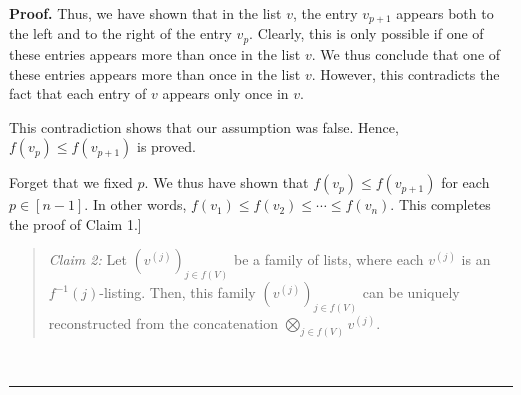 \documentclass[numbers=enddot,12pt,final,onecolumn,notitlepage]{scrartcl}%
\numberwithin{exer}{section}
\theoremstyle{definition}
\newenvironment{statement}{\begin{quote}}{\end{quote}}
\newenvironment{proof}[1][Proof]{\noindent\textbf{#1.} }{\ \rule{0.5em}{0.5em}}
\newenvironment{verlong}{}{}
\begin{document}
\begin{verlong}
\begin{proof}
Thus, we have shown that in the list $v$, the entry $v_{p+1}$ appears both to
the left and to the right of the entry $v_{p}$. Clearly, this is only possible
if one of these entries appears more than once in the list $v$. We thus
conclude that one of these entries appears more than once in the list $v$.
However, this contradicts the fact that each entry of $v$ appears only once in
$v$.

This contradiction shows that our assumption was false. Hence, $f\left(
v_{p}\right)  \leq f\left(  v_{p+1}\right)  $ is proved.

Forget that we fixed $p$. We thus have shown that $f\left(  v_{p}\right)  \leq
f\left(  v_{p+1}\right)  $ for each $p\in\left[  n-1\right]  $. In other
words, $f\left(  v_{1}\right)  \leq f\left(  v_{2}\right)  \leq\cdots\leq
f\left(  v_{n}\right)  $. This completes the proof of Claim 1.]

\begin{statement}
\textit{Claim 2:} Let $\left(  v^{\left(  j\right)  }\right)  _{j\in f\left(
V\right)  }$ be a family of lists, where each $v^{\left(  j\right)  }$ is an
$f^{-1}\left(  j\right)  $-listing. Then, this family $\left(  v^{\left(
j\right)  }\right)  _{j\in f\left(  V\right)  }$ can be uniquely reconstructed
from the concatenation $\bigotimes\limits_{j\in f\left(  V\right)  }v^{\left(
j\right)  }$.
\end{statement}


\end{proof}
\end{verlong}
\end{document}
